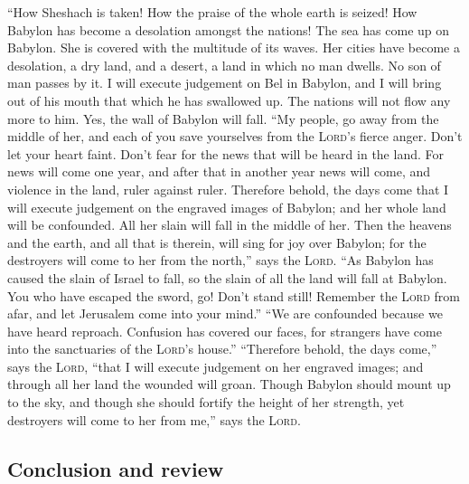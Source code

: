  ``How Sheshach is taken! How the praise of the whole
earth is seized! How Babylon has become a desolation amongst the
nations!  The sea has come up on Babylon. She is covered
with the multitude of its waves.  Her cities have become
a desolation, a dry land, and a desert, a land in which no man dwells.
No son of man passes by it.  I will execute judgement on
Bel in Babylon, and I will bring out of his mouth that which he has
swallowed up. The nations will not flow any more to him. Yes, the wall
of Babylon will fall.  ``My people, go away from the
middle of her, and each of you save yourselves from the \textsc{Lord}'s
fierce anger.  Don't let your heart faint. Don't fear for
the news that will be heard in the land. For news will come one year,
and after that in another year news will come, and violence in the land,
ruler against ruler.  Therefore behold, the days come
that I will execute judgement on the engraved images of Babylon; and her
whole land will be confounded. All her slain will fall in the middle of
her.  Then the heavens and the earth, and all that is
therein, will sing for joy over Babylon; for the destroyers will come to
her from the north,'' says the \textsc{Lord}.  ``As
Babylon has caused the slain of Israel to fall, so the slain of all the
land will fall at Babylon.  You who have escaped the
sword, go! Don't stand still! Remember the \textsc{Lord} from afar, and
let Jerusalem come into your mind.''  ``We are confounded
because we have heard reproach. Confusion has covered our faces, for
strangers have come into the sanctuaries of the \textsc{Lord}'s house.''
 ``Therefore behold, the days come,'' says the
\textsc{Lord}, ``that I will execute judgement on her engraved images;
and through all her land the wounded will groan.  Though
Babylon should mount up to the sky, and though she should fortify the
height of her strength, yet destroyers will come to her from me,'' says
the \textsc{Lord}.

\hypertarget{conclusion-and-review}{%
\subsection{Conclusion and review}\label{conclusion-and-review}}

